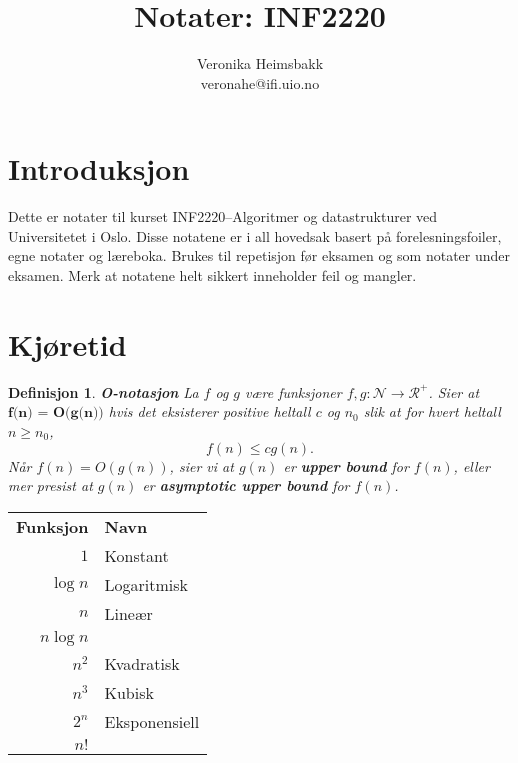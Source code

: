 \documentclass[11pt,a4paper]{article}
\title{Notater: INF2220}
\author{Veronika Heimsbakk \\ 
veronahe@ifi.uio.no}
\theoremstyle{def}
\newtheorem{definition}[subsection]{Definisjon}
\begin{document}
\maketitle{}
\tableofcontents

\section*{Introduksjon}
Dette er notater til kurset INF2220--Algoritmer og datastrukturer\cite{inf2220} ved Universitetet i Oslo. Disse notatene er i all hovedsak basert på forelesningsfoiler, egne notater og læreboka. Brukes til repetisjon før eksamen og som notater under eksamen. Merk at notatene helt sikkert inneholder feil og mangler.

\newpage

\section{Kjøretid}

\begin{definition}
\emph{\textbf{O-notasjon}}
La $f$ og $g$ være funksjoner $f,g: \mathcal{N} \rightarrow \mathcal{R}^+$. Sier at $\textbf{f(n) = O(g(n))}$ hvis det eksisterer positive heltall $c$ og $n_0$ slik at for hvert heltall $n \geq n_0$,
$$f(n) \leq c g(n).$$
Når $f(n) = O(g(n))$, sier vi at $g(n)$ er \textbf{upper bound} for $f(n)$, eller mer presist at $g(n)$ er \textbf{asymptotic upper bound} for $f(n)$.
\end{definition}

\begin{minipage}{0.35\textwidth}
\begin{tabular}{rl}
\textbf{Funksjon}&\textbf{Navn}\\
$1$&Konstant\\
$\log n$&Logaritmisk\\
$n$&Lineær\\
$n \log n$&\\
$n^2$&Kvadratisk\\
$n^3$&Kubisk\\
$2^n$&Eksponensiell\\
$n!$&\\
\end{tabular}
\end{minipage}
\begin{minipage}{0.5\textwidth}
\end{minipage}
\end{document}
